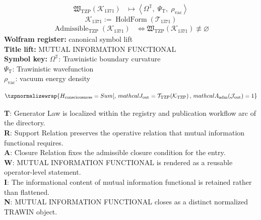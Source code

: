 \noindent
\begin{minipage}[t]{0.48\linewidth}
\begingroup
\small
\[
\begin{aligned}
\mathfrak{W}_{\mathrm{TZP}}\!\left(\mathcal{K}_{1371}\right)
&\longmapsto
\left\langle \Omega^{\mathbb{T}},\; \Psi_{\mathrm{T}},\; \rho_{\mathrm{vac}} \right\rangle
\end{aligned}
\]
\[
\mathcal{K}_{1371}
:=
\operatorname{HoldForm}\!\left(\mathcal{T}_{1371}\right)
\]
\[
\begin{aligned}
\operatorname{Admissible}_{\mathrm{TZP}}\!\left(\mathcal{K}_{1371}\right)
&\Longleftrightarrow
\mathfrak{W}_{\mathrm{TZP}}\!\left(\mathcal{K}_{1371}\right)\not\equiv\varnothing
\end{aligned}
\]
\textbf{Wolfram register:} canonical symbol lift\\
\textbf{Title lift:} MUTUAL INFORMATION FUNCTIONAL\\
\textbf{Symbol key:} \(\Omega^{\mathbb{T}}\): Trawinistic boundary curvature\\ \(\Psi_{\mathrm{T}}\): Trawinistic wavefunction\\ \(\rho_{\mathrm{vac}}\): vacuum energy density
\par
\endgroup
\end{minipage}\hfill
\begin{minipage}[t]{0.48\linewidth}
\[
\tzpnormalizewrap{H_{\mathrm{consciousness}} = Sum[,\,mathcal{J}_{\mathrm{out}} = \mathcal{T}_{\mathrm{TZP}}\!\left(\mathcal{K}_{\mathrm{TZP}}\right),\,mathcal{A}_{\mathrm{adm}}\!\left(\mathcal{J}_{\mathrm{out}}\right)=1}
\]

\small
\textbf{T}: Generator Law is localized within the registry and publication workflow arc of the directory.\\
\textbf{R}: Support Relation preserves the operative relation that mutual information functional requires.\\
\textbf{A}: Closure Relation fixes the admissible closure condition for the entry.\\
\textbf{W}: MUTUAL INFORMATION FUNCTIONAL is rendered as a reusable operator-level statement.\\
\textbf{I}: The informational content of mutual information functional is retained rather than flattened.\\
\textbf{N}: MUTUAL INFORMATION FUNCTIONAL closes as a distinct normalized TRAWIN object.
\normalsize
\end{minipage}

